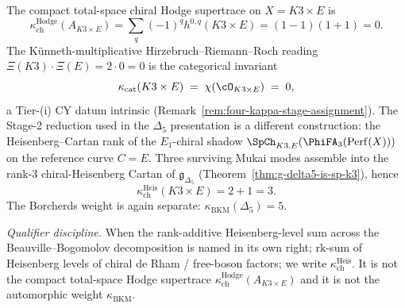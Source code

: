 \begin{remark}[\texorpdfstring{$K3 \times E$}{K3 x E}: total-space \texorpdfstring{$\kappa_{\mathrm{ch}}^{\mathrm{Hodge}} = 0$}{kappa-ch-Hodge = 0}, Heisenberg \texorpdfstring{$\kappa_{\mathrm{ch}}^{\mathrm{Heis}} = 3$}{kappa-ch-Heis = 3}]
\label{rem:beauville-kappa-formula-subscript-split}
The compact total-space chiral Hodge supertrace on $X = K3 \times E$ is
\[
 \kappa_{\mathrm{ch}}^{\mathrm{Hodge}}(A_{K3 \times E})
 = \sum_q(-1)^q h^{0,q}(K3 \times E)
 = (1-1)(1+1)
 = 0.
\]
The K\"unneth-multiplicative Hirzebruch--Riemann--Roch reading $\Xi(K3) \cdot \Xi(E) = 2 \cdot 0 = 0$ is the categorical invariant
\[
 \kappa_{\mathrm{cat}}(K3 \times E) \;=\; \chi(\cO_{K3 \times E}) \;=\; 0,
\]
a Tier-(i) CY datum intrinsic (Remark~\ref{rem:four-kappa-stage-assignment}). The Stage-2 reduction used in the $\Delta_5$ presentation is a different construction: the Heisenberg--Cartan rank of the $E_1$-chiral shadow $\SpCh_{K3, E}(\PhiFA_3(\mathrm{Perf}(X)))$ on the reference curve $C = E$. Three surviving Mukai modes assemble into the rank-$3$ chiral-Heisenberg Cartan of $\mathfrak{g}_{\Delta_5}$ (Theorem~\ref{thm:g-delta5-is-sp-k3}), hence
\[
 \kappa_{\mathrm{ch}}^{\mathrm{Heis}}(K3 \times E) = 2 + 1 = 3.
\]
The Borcherds weight is again separate: $\kappa_{\mathrm{BKM}}(\Delta_5)=5$.

\emph{Qualifier discipline.} When the rank-additive Heisenberg-level sum across the Beauville--Bogomolov decomposition is named in its own right; $\mathrm{rk}$-sum of Heisenberg levels of chiral de Rham / free-boson factors; we write $\kappa_{\mathrm{ch}}^{\mathrm{Heis}}$. It is not the compact total-space Hodge supertrace $\kappa_{\mathrm{ch}}^{\mathrm{Hodge}}(A_{K3 \times E})$ and it is not the automorphic weight $\kappa_{\mathrm{BKM}}$.
\end{remark}


